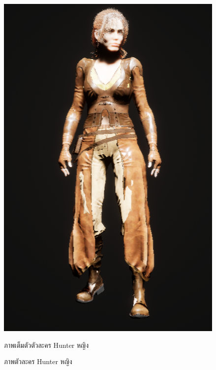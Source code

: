 \begin{figure}
\begin{subcaptionblock}{.4\textwidth}
    \includegraphics[width=.8\linewidth]{./img/characters/emma_full.png}
    \caption{ภาพเต็มตัวตัวละคร Hunter หญิง}\label{ภาพตัวเต็มตัวละคร Hunter หญิง}
  \end{subcaptionblock}%
  \caption{ภาพตัวละคร Hunter หญิง}\label{ภาพตัวละคร Hunter หญิง}
\end{figure}

